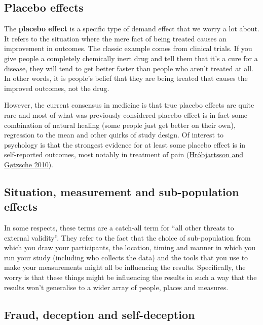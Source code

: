\documentclass[
]{book}
\begin{document}
\hypertarget{placebo-effects}{%
\subsection{Placebo effects}\label{placebo-effects}}

The \textbf{placebo effect} is a specific type of demand effect that we worry a lot about. It refers to the situation where the mere fact of being treated causes an improvement in outcomes. The classic example comes from clinical trials. If you give people a completely chemically inert drug and tell them that it's a cure for a disease, they will tend to get better faster than people who aren't treated at all. In other words, it is people's belief that they are being treated that causes the improved outcomes, not the drug.

However, the current consensus in medicine is that true placebo effects are quite rare and most of what was previously considered placebo effect is in fact some combination of natural healing (some people just get better on their own), regression to the mean and other quirks of study design. Of interest to psychology is that the strongest evidence for at least some placebo effect is in self-reported outcomes, most notably in treatment of pain (\protect\hyperlink{ref-hrobjartsson2010}{Hróbjartsson and Gøtzsche 2010}).

\hypertarget{situation-measurement-and-sub-population-effects}{%
\subsection{Situation, measurement and sub-population effects}\label{situation-measurement-and-sub-population-effects}}

In some respects, these terms are a catch-all term for ``all other threats to external validity''. They refer to the fact that the choice of sub-population from which you draw your participants, the location, timing and manner in which you run your study (including who collects the data) and the tools that you use to make your measurements might all be influencing the results. Specifically, the worry is that these things might be influencing the results in such a way that the results won't generalise to a wider array of people, places and measures.

\hypertarget{fraud-deception-and-self-deception}{%
\subsection{Fraud, deception and self-deception}\label{fraud-deception-and-self-deception}}
\end{document}
